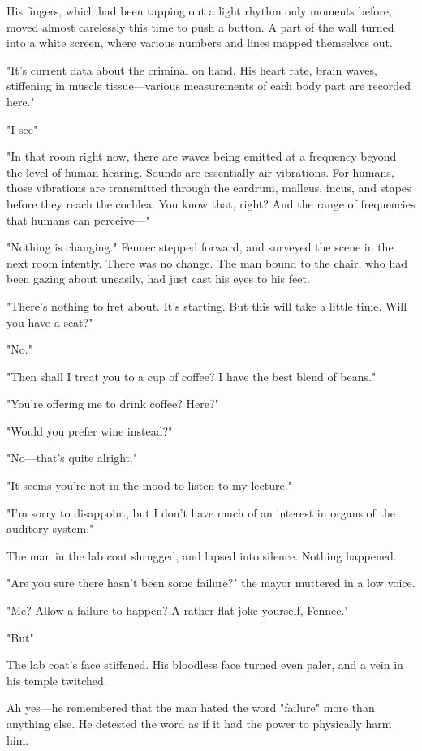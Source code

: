 His fingers, which had been tapping out a light rhythm only moments
before, moved almost carelessly this time to push a button. A part of
the wall turned into a white screen, where various numbers and lines
mapped themselves out.

"It's current data about the criminal on hand. His heart rate, brain
waves, stiffening in muscle tissue---various measurements of each body
part are recorded here."

"I see\el "

"In that room right now, there are waves being emitted at a frequency
beyond the level of human hearing. Sounds are essentially air
vibrations. For humans, those vibrations are transmitted through the
eardrum, malleus, incus, and stapes before they reach the cochlea. You
know that, right? And the range of frequencies that humans can
perceive---"

"Nothing is changing." Fennec stepped forward, and surveyed the scene in
the next room intently. There was no change. The man bound to the chair,
who had been gazing about uneasily, had just cast his eyes to his feet.

"There's nothing to fret about. It's starting. But this will take a
little time. Will you have a seat?"

"No."

"Then shall I treat you to a cup of coffee? I have the best blend of
beans."

"You're offering me to drink coffee? Here?"

"Would you prefer wine instead?"

"No---that's quite alright."

"It seems you're not in the mood to listen to my lecture."

"I'm sorry to disappoint, but I don't have much of an interest in organs
of the auditory system."

The man in the lab coat shrugged, and lapsed into silence. Nothing
happened.

"Are you sure there hasn't been some failure?" the mayor muttered in a
low voice.

"Me? Allow a failure to happen? A rather flat joke yourself, Fennec."

"But\el "

The lab coat's face stiffened. His bloodless face turned even paler, and
a vein in his temple twitched.

Ah yes---he remembered that the man hated the word "failure" more than
anything else. He detested the word as if it had the power to physically
harm him.

